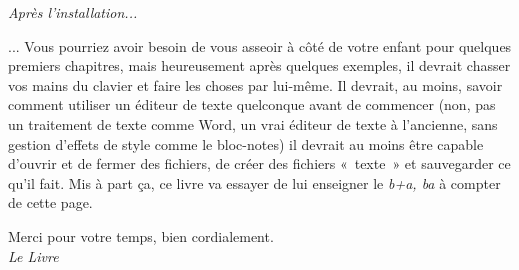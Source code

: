 \textit{Après l'installation...}


... Vous pourriez avoir besoin de vous asseoir à côté de votre enfant pour quelques premiers chapitres, mais 
heureusement après quelques exemples, il devrait chasser vos mains du clavier et faire les choses par lui-même. 
Il devrait, au moins, savoir comment utiliser un éditeur de texte quelconque avant de commencer (non, pas un traitement de texte comme Word, un vrai éditeur de texte à l'ancienne, sans gestion d'effets de style comme le bloc-notes) il devrait au moins être capable d'ouvrir et de fermer des fichiers, de créer des fichiers «~texte~» et sauvegarder ce qu'il fait. Mis à part ça, ce livre va essayer de lui enseigner le \textit{b+a, ba} à compter de cette page.

\bigskip
Merci pour votre temps, bien cordialement.\\


\textit{Le Livre}